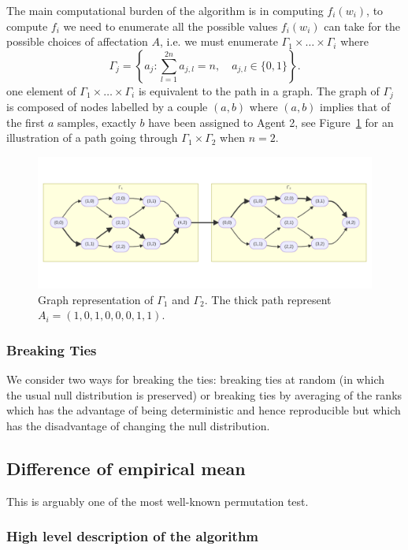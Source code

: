 \documentclass{article}
\theoremstyle{plain}
\theoremstyle{remark}
\newcommand{\1}{\mathbbm{1}}
\numberwithin{equation}{section}
\begin{document}
The main computational burden of the algorithm is in computing $f_i(w_i)$, to compute $f_i$ we need to enumerate all the possible values $f_i(w_i)$ can take for the possible choices of affectation $A$, i.e. we must enumerate $\Gamma_1 \times \dots \times \Gamma_i$ where
$$\Gamma_j= \left\{a_j: \sum_{l=1}^{2n}a_{j,l} = n,\quad a_{j,l}\in \{0,1 \}\right\}.$$
one element of $\Gamma_1 \times \dots \times \Gamma_i$ is equivalent to the path in a graph. The graph of $\Gamma_j$ is composed of nodes labelled by a couple $(a,b)$ where $(a,b)$ implies that of the first $a$ samples, exactly $b$ have been assigned to Agent 2, see Figure~\ref{fig:graph} for an illustration of a path going through $\Gamma_1\times \Gamma_2$ when $n=2$.
\begin{figure}[h!]
\begin{center}
\includegraphics[scale=0.7]{graph_gamma.pdf}
\caption{Graph representation of $\Gamma_1$ and $\Gamma_2$. The thick path represent $A_i=(1,0,1,0,0,0,1,1)$\label{fig:graph}.}
\end{center}
\end{figure}

\subsubsection{Breaking Ties}
We consider two ways for breaking the ties: breaking ties at random (in which the usual null distribution is preserved) or breaking ties by averaging of the ranks which has the advantage of being deterministic and hence reproducible but which has the disadvantage of changing the null distribution.

\subsection{Difference of empirical mean}
This is arguably one of the most well-known permutation test. 

\subsubsection{High level description of the algorithm}
\end{document}

